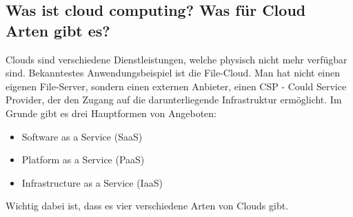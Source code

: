 \subsection*{Was ist \flqq cloud computing\frqq{}? Was für Cloud Arten gibt es?}
Clouds sind verschiedene Dienstleistungen, welche physisch nicht mehr verfügbar sind. Bekanntestes Anwendungsbeispiel ist die File-Cloud. Man hat nicht einen eigenen File-Server, sondern einen externen Anbieter, einen CSP - Could Service Provider, der den Zugang auf die darunterliegende Infrastruktur ermöglicht. Im Grunde gibt es drei Hauptformen von Angeboten:
\begin{itemize}
    \item Software as a Service (SaaS)
    \item Platform as a Service (PaaS)
    \item Infrastructure as a Service (IaaS)
\end{itemize}
Wichtig dabei ist, dass es vier verschiedene Arten von Clouds gibt.
